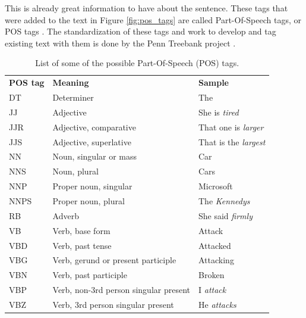 \documentclass[11pt,a4paper,openright]{memoir}
\begin{document}
This is already great information to have about the sentence. These tags that were added to the text in Figure \ref{fig:pos_tags} are called Part-Of-Speech tags, or POS tags \cite{Jurafsky:2000:SLP:555733}. The standardization of these tags and work to develop and tag existing text with them is done by the Penn Treebank project \cite{Marcus:1993:BLA:972470.972475}.

\begin{table}[!htbp]
  \centering
    \begin{tabular}{lll}
      \textbf{POS tag}     & \textbf{Meaning}     & \textbf{Sample} \\
      DT   & Determiner                            & The                     \\
      JJ   & Adjective                             & She is \emph{tired}     \\
      JJR  & Adjective, comparative                & That one is \emph{larger} \\
      JJS  & Adjective, superlative                & That is the \emph{largest}     \\
      NN   & Noun, singular or mass                & Car                     \\
      NNS  & Noun, plural                          & Cars                    \\
      NNP  & Proper noun, singular                 & Microsoft               \\
      NNPS & Proper noun, plural                   & The \emph{Kennedys}            \\
      RB   & Adverb                                & She said \emph{firmly}         \\
      VB   & Verb, base form                       & Attack                  \\
      VBD  & Verb, past tense                      & Attacked                \\
      VBG  & Verb, gerund or present participle    & Attacking               \\
      VBN  & Verb, past participle                 & Broken                  \\
      VBP  & Verb, non-3rd person singular present & I \emph{attack}                \\
      VBZ  & Verb, 3rd person singular present     & He \emph{attacks}               
    \end{tabular}
  \caption[List of some of the possible Part-Of-Speech (POS) tags.]{List of some of the possible Part-Of-Speech (POS) tags.}
  \label{tab:pos_tags}
\end{table}
\end{document}
